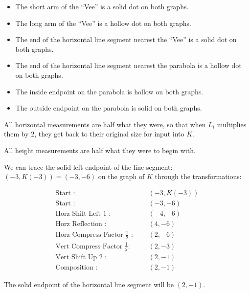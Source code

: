 \documentclass{ximera}
\begin{document}
\begin{itemize}
\item The short arm of the ``Vee'' is a solid dot on both graphs.
\item The long arm of the ``Vee'' is a hollow dot on both graphs.
\item The end of the horizontal line segment nearest the ``Vee'' is a solid dot on both graphs.
\item The end of the horizontal line segment nearest the parabola is a hollow dot on both graphs.
\item The inside endpoint on the parabola is hollow on both graphs.
\item The outside endpoint on the parabola is solid on both graphs.
\end{itemize}










All horizontal measurements are half what they were, so that when $L_i$ multiplies them by $2$, they get back to their original size for input into $K$.

All height measurements are half what they were to begin with.



We can trace the solid left endpoint of the line segment: $(-3, K(-3)) = (-3, -6)$ on the graph of $K$ through the transformations:





\begin{align*}
\text{Start :} & \text{  } & (-3, K(-3))  \\
\text{Start :} & \text{  } & (-3, -6) \\
\text{Horz Shift Left $1$ :} & \text{  } & (-4,-6)   \\
\text{Horz Reflection :} & \text{  } & (4, -6)   \\
\text{Horz Compress Factor $\tfrac{1}{2}$ :}  & \text{  } & (2, -6)   \\
\text{Vert Compress Factor $\tfrac{1}{2}$:} & \text{  } & (2, -3)   \\
\text{Vert Shift Up $2$ :} & \text{  } & (2, -1)   \\
\text{Composition :} & \text{  } & (2, -1)   
\end{align*}


The solid endpoint of the horizontal line segment will be $(2, -1)$.
\end{document}
